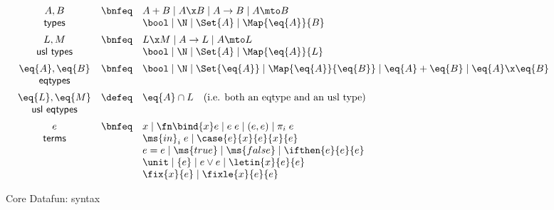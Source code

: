 \documentclass[preprint]{sigplanconf}
\renewcommand{\pipe}{\;|\;}
\newcommand{\uto}{\to}
\begin{document}

\begin{figure}
  \[\begin{array}{ccl}
    A, B     &\bnfeq& A + B \pipe A \x B \pipe A \uto B \pipe A \mto B
    \\
    \textsf{types} && \bool \pipe \N \pipe \Set{A} \pipe \Map{\eq{A}}{B}
    \vspace{0.5em}\\
    L, M         &\bnfeq& L \x M \pipe A \uto L \pipe A \mto L
    \\
    \textsf{usl types} && \bool \pipe \N \pipe \Set{A} \pipe \Map{\eq{A}}{L}
    \vspace{0.5em}\\
    \eq{A}, \eq{B} &\bnfeq& \bool \pipe \N \pipe \Set{\eq{A}}
                            \pipe \Map{\eq{A}}{\eq{B}}
                            \pipe \eq{A} + \eq{B} \pipe \eq{A} \x \eq{B}\\
    \textsf{eqtypes}\vspace{0.5em}\\
    \eq{L}, \eq{M} &\defeq& \eq{A} \cap L
                    \quad\text{(i.e. both an eqtype and an usl type)}\\
    \textsf{usl eqtypes} &&
    \vspace{0.5em}\\
    e &\bnfeq& x \pipe \fn\bind{x} e \pipe e\;e \pipe (e,e) \pipe \pi_i\;e\\
    \textsf{terms} && \ms{in}_i\;e \pipe \case{e}{x}{e}{x}{e}\\
    && e = e \pipe \ms{true} \pipe \ms{false} \pipe \ifthen{e}{e}{e}\\
    && \unit \pipe \{e\} \pipe e \vee e \pipe \letin{x}{e}{e}\\
    && \fix{x}{e} \pipe \fixle{x}{e}{e}
  \end{array}\]
  \caption{Core Datafun: syntax}
\end{figure}
\end{document}
